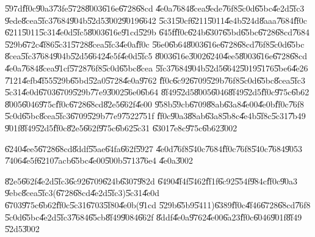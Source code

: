 \documentclass{article}
\begin{document}
\U{597d}\U{ff0c}\U{90a3}\U{73fe}\U{5728}\U{8003}\U{616e}\U{6728}\U{68cd}%
\U{4e0a}\U{7684}\U{8cea}\U{9ede}\U{76f8}\U{5c0d}\U{65bc}\U{4e2d}\U{5fc3}%
\U{9ede}\U{8cea}\U{5fc3}\U{7684}\U{904b}\U{52d5}\U{3002}\U{9019}\U{6642}%
\U{5c31}\U{50cf}\U{6211}\U{5011}\U{4e4b}\U{524d}\U{8aaa}\U{7684}\U{ff0c}%
\U{6211}\U{5011}\U{5c31}\U{4e0d}\U{5fc5}\U{8003}\U{616e}\U{91cd}\U{529b}%
\U{645f}\U{ff0c}\U{624b}\U{6307}\U{65bd}\U{65bc}\U{6728}\U{68cd}\U{7684}%
\U{529b}\U{672c}\U{4f86}\U{5c31}\U{5728}\U{8cea}\U{5fc3}\U{4e0a}\U{ff0c}%
\U{56e0}\U{6b64}\U{8003}\U{616e}\U{6728}\U{68cd}\U{76f8}\U{5c0d}\U{65bc}%
\U{8cea}\U{5fc3}\U{7684}\U{904b}\U{52d5}\U{6642}\U{4e5f}\U{4e0d}\U{5fc5}%
\U{8003}\U{616e}\U{3002}\U{6240}\U{4ee5}\U{8003}\U{616e}\U{6728}\U{68cd}%
\U{4e0a}\U{7684}\U{8cea}\U{91cf}\U{5728}\U{76f8}\U{5c0d}\U{65bc}\U{8cea}%
\U{5fc3}\U{7684}\U{904b}\U{52d5}\U{6642}\U{5019}\U{5176}\U{5be6}\U{4e26}%
\U{7121}\U{4efb}\U{4f55}\U{529b}\U{65bd}\U{52a0}\U{5728}\U{4e0a}\U{9762}%
\U{ff0c}\U{6c92}\U{6709}\U{529b}\U{76f8}\U{5c0d}\U{65bc}\U{8cea}\U{5fc3}%
\U{5c31}\U{4e0d}\U{6703}\U{6709}\U{529b}\U{77e9}\U{3002}\U{56e0}\U{6b64}%
\U{8f49}\U{52d5}\U{8005}\U{6046}\U{8f49}\U{52d5}\U{ff0c}\U{975c}\U{6b62}%
\U{8005}\U{6046}\U{975c}\U{ff0c}\U{6728}\U{68cd}\U{82e5}\U{662f}\U{4e00}%
\U{958b}\U{59cb}\U{6709}\U{88ab}\U{63a8}\U{4e00}\U{4e0b}\U{ff0c}\U{76f8}%
\U{5c0d}\U{65bc}\U{8cea}\U{5fc3}\U{6709}\U{529b}\U{77e9}\U{7522}\U{751f}%
\U{ff0c}\U{90a3}\U{88ab}\U{63a8}\U{5b8c}\U{4e4b}\U{5f8c}\U{5c31}\U{7b49}%
\U{901f}\U{8f49}\U{52d5}\U{ff0c}\U{82e5}\U{662f}\U{975c}\U{6b62}\U{5c31}%
\U{6301}\U{7e8c}\U{975c}\U{6b62}\U{3002}

\U{6240}\U{4ee5}\U{6728}\U{68cd}\U{8ddf}\U{55ae}\U{64fa}\U{662f}\U{5927}%
\U{4e0d}\U{76f8}\U{540c}\U{7684}\U{ff0c}\U{76f8}\U{540c}\U{7684}\U{9053}%
\U{7406}\U{4e5f}\U{6210}\U{7acb}\U{65bc}\U{4e00}\U{500b}\U{5713}\U{76e4}%
\U{4e0a}\U{3002}

\U{82e5}\U{662f}\U{4e2d}\U{5fc3}\U{6c92}\U{6709}\U{624b}\U{6307}\U{982d}%
\U{6490}\U{4f4f}\U{5462}\U{ff1f}\U{6c92}\U{554f}\U{984c}\U{ff0c}\U{90a3}%
\U{9ebc}\U{8cea}\U{5fc3}(\U{6728}\U{68cd}\U{4e2d}\U{5fc3})\U{5c31}\U{4e0d}%
\U{6703}\U{975c}\U{6b62}\U{ff0c}\U{5c31}\U{6703}\U{5f80}\U{4e0b}(\U{91cd}%
\U{529b}\U{65b9}\U{5411})\U{6389}\U{ff0c}\U{4f46}\U{6728}\U{68cd}\U{76f8}%
\U{5c0d}\U{65bc}\U{4e2d}\U{5fc3}\U{7684}\U{65cb}\U{8f49}\U{9084}\U{662f}%
\U{8ddf}\U{4e0a}\U{9762}\U{4e00}\U{6a23}\U{ff0c}\U{6046}\U{901f}\U{8f49}%
\U{52d5}\U{3002}
\end{document}
